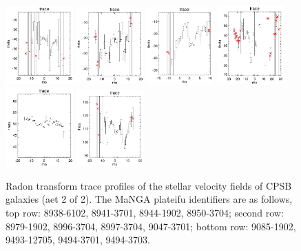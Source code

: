 \documentclass[fleqn,usenatbib]{mnras}
\begin{document}
\begin{figure}
    \includegraphics[width=0.23\textwidth]{Images/trace-plots/trace-plots-cpsbs/8997-3704.png}
    \includegraphics[width=0.23\textwidth]{Images/trace-plots/trace-plots-cpsbs/9047-3701.png}
    \includegraphics[width=0.23\textwidth]{Images/trace-plots/trace-plots-cpsbs/9085-1902.png}
    \includegraphics[width=0.23\textwidth]{Images/trace-plots/trace-plots-cpsbs/9493-12705.png}
    \includegraphics[width=0.23\textwidth]{Images/trace-plots/trace-plots-cpsbs/9494-3701.png}
    \includegraphics[width=0.23\textwidth]{Images/trace-plots/trace-plots-cpsbs/9494-3703.png}
    \caption{Radon transform trace profiles of the stellar velocity fields of CPSB galaxies (aet 2 of 2). The MaNGA plateifu identifiers are as follows, top row: 8938-6102, 8941-3701, 8944-1902, 8950-3704; second row: 8979-1902, 8996-3704, 8997-3704, 9047-3701; bottom row: 9085-1902, 9493-12705, 9494-3701, 9494-3703.}
    \label{fig:Radon-traces-CPSBs-2}
\end{figure}
\end{document}

